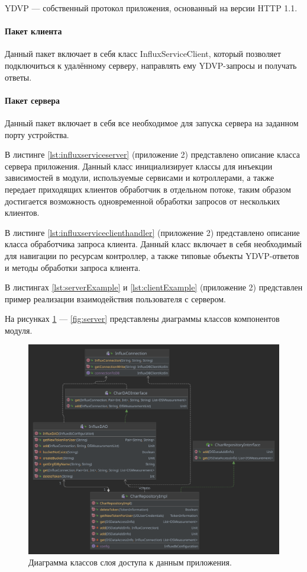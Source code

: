 YDVP --- собственный протокол приложения, основанный на версии HTTP 1.1.

\paragraph{Пакет клиента \newline}
Данный пакет включает в себя класс InfluxServiceClient, который позволяет подключиться к удалённому серверу, направлять ему YDVP-запросы и получать ответы.

\paragraph{Пакет сервера \newline}

Данный пакет включает в себя все необходимое для запуска сервера на заданном порту устройства.

В листинге \ref{lst:influxserviceserver} (приложение 2) представлено описание класса сервера приложения. Данный класс инициализирует классы для инъекции зависимостей в модули, используемые сервисами и котроллерами, а также передает приходящих клиентов обработчик в отдельном потоке, таким образом достигается возможность одновременной обработки запросов от нескольких клиентов.

В листинге \ref{lst:influxserviceclienthandler} (приложение 2) представлено описание класса обработчика запроса клиента. Данный класс включает в себя необходимый для навигации по ресурсам контроллер, а также типовые объекты YDVP-ответов и методы обработки запроса клиента.

В листингах \ref{lst:serverExample} и \ref{lst:clientExample} (приложение 2) представлен пример реализации взаимодействия пользователя с сервером.

На рисунках \ref{fig:dostup} --- \ref{fig:server} представлены диаграммы классов компонентов модуля.

\begin{figure}[H]
	\centering
	\includegraphics[width=\textwidth]{img/dostup.pdf}
	\caption{Диаграмма классов слоя доступа к данным приложения.}
	\label{fig:dostup}
\end{figure}

